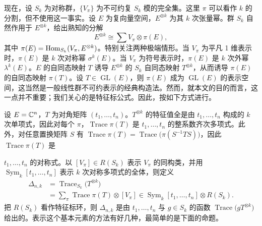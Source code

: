 现在，设 $S_k$ 为对称群，$\{V_\pi\}$ 为不可约复 $S_k$ 模的完全集。这里 $\pi$ 可以看作 $k$ 的分割，但不使用这一事实。设 $E$ 为复向量空间，$E^{\otimes k}$ 为其 $k$ 次张量幂。群 $S_k$ 自然作用于 $E^{\otimes k}$，给出熟知的分解
\[
  E^{\otimes k}\cong \sum V_\pi\otimes\pi(E),
\]
其中 $\pi(E)=\operatorname{Hom}_{S_k}(V_\pi,E^{\otimes k})$。特别关注两种极端情形。当 $V_\pi$ 为平凡 1 维表示时，$\pi(E)$ 是 $k$ 次对称幂 $\sigma^k(E)$。当 $V_\pi$ 为符号表示时，$\pi(E)$ 是 $k$ 次外幂 $\lambda^k(E)$。$E$ 的自同态映射 $T$ 诱导 $E^{\otimes k}$ 的 $S_k$ 自同态映射 $T^{\otimes k}$，从而诱导 $\pi(E)$ 的自同态映射 $\pi(T)$。设 $T\in \operatorname{GL}(E)$，则 $\pi(E)$ 成为 $\operatorname{GL}(E)$ 的表示空间，这当然是一般线性群不可约表示的经典构造法。然而，就本文的目的而言，这一点并不重要；我们关心的是特征标公式。因此，按如下方式进行。


设 $E=\mathbb{C}^n$，$T$ 为对角矩阵 $(t_1,\ldots,t_n)$。$T^{\otimes k}$ 的特征值全是由 $t_1,\ldots,t_n$ 构成的 $k$ 次单项式，因此对每个 $\pi$，$\operatorname{Trace}\pi(T)$ 是 $t_1,\ldots,t_n$ 的整系数齐次多项式。此外，对任意置换矩阵 $S$ 有 $\operatorname{Trace}\pi(T)=\operatorname{Trace}\bigl(\pi(S^{-1}TS)\bigr)$，因此 $\operatorname{Trace}\pi(T)$ 是

$t_1,\ldots,t_n$ 的对称式。以 $[V_\pi]\in R(S_k)$ 表示 $V_\pi$ 的同构类，并用 $\operatorname{Sym}_k[t_1,\ldots,t_n]$ 表示 $k$ 次对称多项式的全体，则定义
\begin{align*}
  \Delta_{n,k} &= \operatorname{Trace}_{S_k}\bigl(T^{\otimes k}\bigr)\\
  &= \sum_\pi \operatorname{Trace}\pi(T)\otimes[V_\pi]
     \in \operatorname{Sym}_k[t_1,\ldots,t_n]\otimes R(S_k).
\end{align*}
把 $R(S_k)$ 看作特征标环，则 $\Delta_{n,k}$ 是由 $t_1,\ldots,t_n$ 与 $g\in S_k$ 的函数 $\operatorname{Trace}\bigl(gT^{\otimes k}\bigr)$ 给出的。表示这个基本元素的方法有好几种，最简单的是下面的命题。


